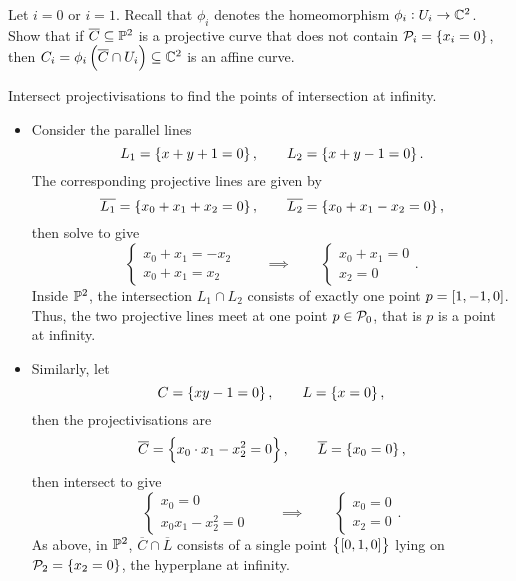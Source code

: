 \begin{exercise**}
Let $ i = 0 $ or $ i = 1 $. Recall that $ \phi_i $ denotes the homeomorphism $ \phi_i : U_i \to \mathbb{C}^2 $. Show that if $ \overline{C} \subseteq \mathbb{P}^2 $ is a projective curve that does not contain $ \PPP_i = \cbr{x_i = 0} $, then $ C_i = \phi_i\br{\overline{C} \cap U_i} \subseteq \CC^2 $ is an affine curve.
\end{exercise**}


\begin{example}
Intersect projectivisations to find the points of intersection at infinity.
\begin{itemize}
\item Consider the parallel lines
$$ L_1 = \cbr{x + y + 1 = 0}, \qquad L_2 = \cbr{x + y - 1 = 0}. $$
The corresponding projective lines are given by
$$ \overline{L_1} = \cbr{x_0 + x_1 + x_2 = 0}, \qquad \overline{L_2} = \cbr{x_0 + x_1 - x_2 = 0}, $$
then solve to give
$$
\begin{cases}
x_0 + x_1 = -x_2 \\
x_0 + x_1 = x_2
\end{cases}
\qquad \implies \qquad
\begin{cases}
x_0 + x_1 = 0 \\
x_2 = 0
\end{cases}.
$$
Inside $ \mathbb{P}^2 $, the intersection $ L_1 \cap L_2 $ consists of exactly one point $ p = \sbr{1, -1, 0} $. Thus, the two projective lines meet at one point $ p \in \mathcal{P}_0 $, that is $ p $ is a point at infinity.
\item Similarly, let
$$ C = \cbr{xy - 1 = 0}, \qquad L = \cbr{x = 0}, $$
then the projectivisations are
$$ \overline{C} = \cbr{x_0 \cdot x_1 - x_2^2 = 0}, \qquad \overline{L} = \cbr{x_0 = 0}, $$
then intersect to give
$$
\begin{cases}
x_0 = 0 \\
x_0x_1 - x_2^2 = 0
\end{cases}
\qquad \implies \qquad
\begin{cases}
x_0 = 0 \\
x_2 = 0
\end{cases}.
$$
As above, in $ \mathbb{P}^2 $, $ \overline{C} \cap \overline{L} $ consists of a single point $ \cbr{\sbr{0, 1, 0}} $ lying on $ \PPP_2 = \cbr{x_2 = 0} $, the hyperplane at infinity.
\end{itemize}
\end{example}

\pagebreak

